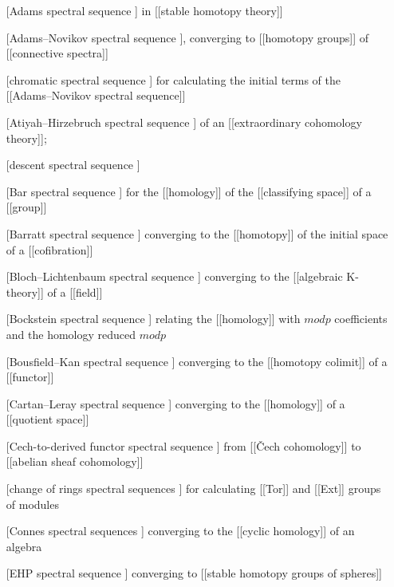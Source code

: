 \documentclass[12pt,titlepage]{article}
\theoremstyle{plain}
\theoremstyle{definition}
\theoremstyle{remark}
\begin{document}
\begin{itemize}%
\item [[Adams spectral sequence]] in [[stable homotopy theory]]


\item [[Adams–Novikov spectral sequence]], converging to [[homotopy groups]] of [[connective spectra]]


\item [[chromatic spectral sequence]] for calculating the initial terms of the [[Adams–Novikov spectral sequence]]


\item [[Atiyah–Hirzebruch spectral sequence]] of an [[extraordinary cohomology theory]];


\item [[descent spectral sequence]]


\item [[Bar spectral sequence]] for the [[homology]] of the [[classifying space]] of a [[group]]


\item [[Barratt spectral sequence]] converging to the [[homotopy]] of the initial space of a [[cofibration]]


\item [[Bloch–Lichtenbaum spectral sequence]] converging to the [[algebraic K-theory]] of a [[field]]


\item [[Bockstein spectral sequence]] relating the [[homology]] with $mod p$ coefficients and the homology reduced $mod p$


\item [[Bousfield–Kan spectral sequence]] converging to the [[homotopy colimit]] of a [[functor]]


\item [[Cartan–Leray spectral sequence]] converging to the [[homology]] of a [[quotient space]]


\item [[Cech-to-derived functor spectral sequence]] from [[Čech cohomology]] to [[abelian sheaf cohomology]]


\item [[change of rings spectral sequences]] for calculating [[Tor]] and [[Ext]] groups of modules


\item [[Connes spectral sequences]] converging to the [[cyclic homology]] of an algebra


\item [[EHP spectral sequence]] converging to [[stable homotopy groups of spheres]]



\end{itemize}
\end{document}
